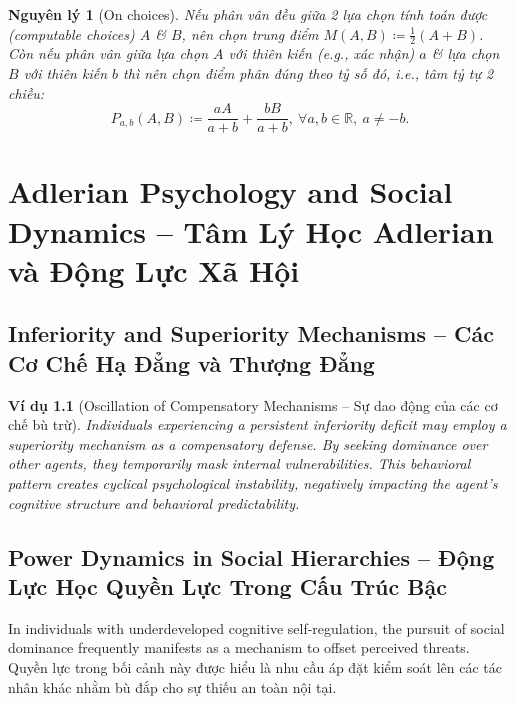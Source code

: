 \documentclass{report}
\newtheorem{nguyenly}{Nguyên lý}
\newtheorem{vidu}{Ví dụ}
\begin{document}

\begin{nguyenly}[On choices]
	Nếu phân vân đều giữa 2 lựa chọn tính toán được (computable choices) $A$ \& $B$, nên chọn trung điểm $M(A,B)\coloneqq\frac{1}{2}(A + B)$. Còn nếu phân vân giữa lựa chọn $A$ với thiên kiến (e.g., xác nhận) $a$ \& lựa chọn $B$ với thiên kiến $b$ thì nên chọn điểm phân đúng theo tỷ số đó, i.e., tâm tỷ tự 2 chiều:
	\begin{equation*}
		P_{a,b}(A,B)\coloneqq\frac{aA}{a + b} + \frac{bB}{a + b},\ \forall a,b\in\mathbb{R},\ a\ne-b.
	\end{equation*}
\end{nguyenly}


\chapter{Adlerian Psychology and Social Dynamics -- Tâm Lý Học Adlerian và Động Lực Xã Hội}

\section{Inferiority and Superiority Mechanisms -- Các Cơ Chế Hạ Đẳng và Thượng Đẳng}
\begin{vidu}[Oscillation of Compensatory Mechanisms -- Sự dao động của các cơ chế bù trừ]
    Individuals experiencing a persistent inferiority deficit may employ a superiority mechanism as a compensatory defense. By seeking dominance over other agents, they temporarily mask internal vulnerabilities. This behavioral pattern creates cyclical psychological instability, negatively impacting the agent's cognitive structure and behavioral predictability.
\end{vidu}

\section{Power Dynamics in Social Hierarchies -- Động Lực Học Quyền Lực Trong Cấu Trúc Bậc}
\label{sect: power}
In individuals with underdeveloped cognitive self-regulation, the pursuit of social dominance frequently manifests as a mechanism to offset perceived threats. Quyền lực trong bối cảnh này được hiểu là nhu cầu áp đặt kiểm soát lên các tác nhân khác nhằm bù đắp cho sự thiếu an toàn nội tại.
\end{document}
